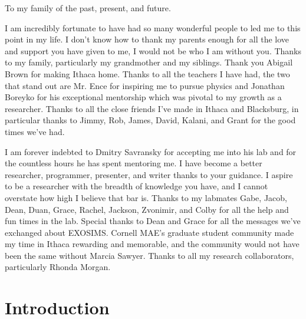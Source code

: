 \documentclass[phd,tocprelim]{cornell}
\begin{document}
\begin{dedication}
To my family of the past, present, and future.
\end{dedication}

\begin{acknowledgements}

I am incredibly fortunate to have had so many wonderful people to led me to
this point in my life. I don't know how to thank my parents enough for all the
love and support you have given to me, I would not be who I am without you.
Thanks to my family, particularly my grandmother and my siblings. Thank you
Abigail Brown for making Ithaca home. Thanks to all the teachers I have had,
the two that stand out are Mr. Ence for inspiring me to pursue physics and
Jonathan Boreyko for his exceptional mentorship which was pivotal to my growth
as a researcher. Thanks to all the close friends I've made in Ithaca and
Blacksburg, in particular thanks to Jimmy, Rob, James, David, Kalani, and Grant
for the good times we've had.

I am forever indebted to Dmitry Savransky for accepting me into his lab and for
the countless hours he has spent mentoring me. I have become a better
researcher, programmer, presenter, and writer thanks to your guidance. I aspire
to be a researcher with the breadth of knowledge you have, and I cannot
overstate how high I believe that bar is. Thanks to my labmates Gabe, Jacob,
Dean, Duan, Grace, Rachel, Jackson, Zvonimir, and Colby for all the help and
fun times in the lab. Special thanks to Dean and Grace for all the messages
we've exchanged about EXOSIMS. Cornell MAE's graduate student community made my
time in Ithaca rewarding and memorable, and the community would not have been
the same without Marcia Sawyer. Thanks to all my research collaborators,
particularly Rhonda Morgan.


\end{acknowledgements}

\contentspage
\tablelistpage
\figurelistpage

\normalspacing \setcounter{page}{1} 
\pagestyle{cornell} \addtolength{\parskip}{0.5\baselineskip}

\chapter{Introduction}
\label{cha:intro}

\end{document}
